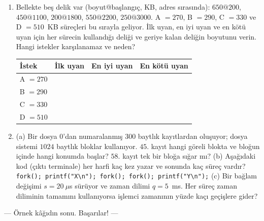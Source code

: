 \documentclass[11pt,a4paper]{article}
\begin{document}
\begin{enumerate}[leftmargin=2.0em,label=C\arabic*.,itemsep=0.5em]
  \newpage
  \item {} Bellekte beş delik var (boyut@başlangıç, KB, adres sırasında): $650@200$, $450@1100$, $200@1800$, $550@2200$, $250@3000$. A $= 270$, B $= 290$, C $= 330$ ve D $= 510$~KB süreçleri bu sırayla geliyor. İlk uyan, en iyi uyan ve en kötü uyan için her sürecin kullandığı deliği ve geriye kalan deliğin boyutunu verin. Hangi istekler karşılanamaz ve neden?
  \begin{center}
  \renewcommand{\arraystretch}{2.0}
  \begin{tabular}{|l|p{4.0cm}|p{4.0cm}|p{4.0cm}|}
  \hline
  \textbf{İstek} & \textbf{İlk uyan} & \textbf{En iyi uyan} & \textbf{En kötü uyan} \\ \hline
  A $= 270$ &&& \\ \hline
  B $= 290$ &&& \\ \hline
  C $= 330$ &&& \\ \hline
  D $= 510$ &&& \\ \hline
  \end{tabular}
  \end{center}
  \ans{2.0cm}

  \item {}
  (a) Bir dosya $0$'dan numaralanmış $300$ baytlık kayıtlardan oluşuyor; dosya sistemi $1024$ baytlık bloklar kullanıyor. $45$. kayıt hangi göreli blokta ve bloğun içinde hangi konumda başlar? $58$. kayıt tek bir bloğa sığar mı? 
  \ans{3.0cm}
  (b) Aşağıdaki kod (çıktı terminale) her harfi kaç kez yazar ve sonunda kaç süreç vardır? \\
  \texttt{fork(); printf("X\textbackslash n"); fork(); fork(); printf("Y\textbackslash n");}
  \ans{2.2cm}
  (c) Bir bağlam değişimi $s = 20\ \mu$s sürüyor ve zaman dilimi $q = 5$~ms. Her süreç zaman diliminin tamamını kullanıyorsa işlemci zamanının yüzde kaçı geçişlere gider? 
  \ans{2.0cm}
\end{enumerate}

\vfill
\begin{center}\small\color{muted}--- Örnek kâğıdın sonu. Başarılar! ---\end{center}
\end{document}
